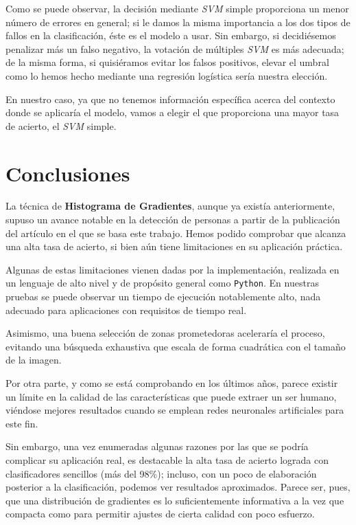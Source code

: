 \documentclass[11pt,a4paper]{article}
\begin{document}
                \par
                Como se puede observar, la decisión mediante \textit{SVM} simple proporciona un menor número de errores en general; si le damos la misma importancia a los dos tipos de fallos en la clasificación, éste es el modelo a usar. Sin embargo, si decidiésemos penalizar más un falso negativo, la votación de múltiples \textit{SVM} es más adecuada; de la misma forma, si quisiéramos evitar los falsos positivos, elevar el umbral como lo hemos hecho mediante una regresión logística sería nuestra elección.

                \par
                En nuestro caso, ya que no tenemos información específica acerca del contexto donde se aplicaría el modelo, vamos a elegir el que proporciona una mayor tasa de acierto, el \textit{SVM} simple.

    \section{Conclusiones}

        \par
        La técnica de \textbf{Histograma de Gradientes}, aunque ya existía anteriormente, supuso un avance notable en la detección de personas a partir de la publicación del artículo en el que se basa este trabajo. Hemos podido comprobar que alcanza una alta tasa de acierto, si bien aún tiene limitaciones en su aplicación práctica.

        \par
        Algunas de estas limitaciones vienen dadas por la implementación, realizada en un lenguaje de alto nivel y de propósito general como \texttt{Python}. En nuestras pruebas se puede observar un tiempo de ejecución notablemente alto, nada adecuado para aplicaciones con requisitos de tiempo real.

        \par
        Asimismo, una buena selección de zonas prometedoras aceleraría el proceso, evitando una búsqueda exhaustiva que escala de forma cuadrática con el tamaño de la imagen.

        \par
        Por otra parte, y como se está comprobando en los últimos años, parece existir un límite en la calidad de las características que puede extraer un ser humano, viéndose mejores resultados cuando se emplean redes neuronales artificiales para este fin.

        \par
        Sin embargo, una vez enumeradas algunas razones por las que se podría complicar su aplicación real, es destacable la alta tasa de acierto lograda con clasificadores sencillos (más del 98\%); incluso, con un poco de elaboración posterior a la clasificación, podemos ver resultados aproximados. Parece ser, pues, que una distribución de gradientes es lo suficientemente informativa a la vez que compacta como para permitir ajustes de cierta calidad con poco esfuerzo.
\end{document}
